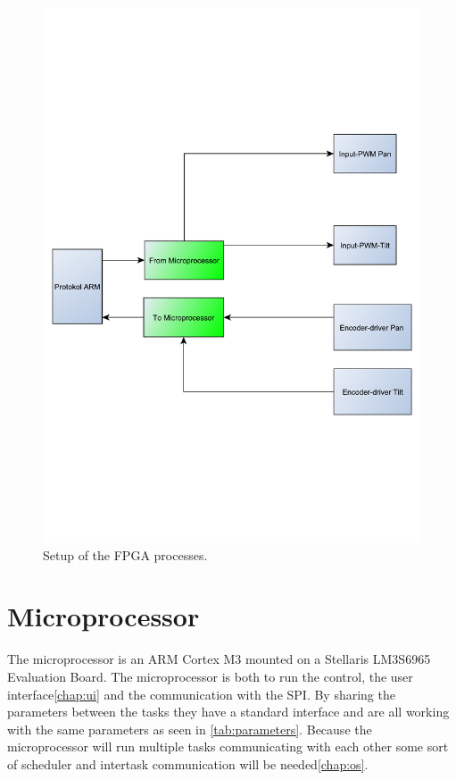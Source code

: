\begin{figure}[htb]
	\centering
	\includegraphics[scale=0.42,trim=200 200 200 200]{graphics/FPGA} %
	\caption{Setup of the FPGA processes.}
	\label{fig:FPGA}			%
\end{figure}

\section{Microprocessor}\label{sec:microprocessor}

The microprocessor is an ARM Cortex M3 mounted on a Stellaris LM3S6965 Evaluation Board. The microprocessor is both to run the control, the user interface\ref{chap:ui} and the communication with the SPI. By sharing the parameters between the tasks they have a standard interface and are all working with the same parameters as seen in  \ref{tab:parameters}. Because the microprocessor will run multiple tasks communicating with each other some sort of scheduler and intertask communication will be needed\ref{chap:os}.


